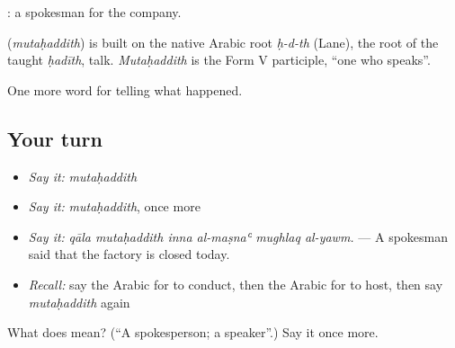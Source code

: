   : a spokesman for the company.

\begin{cousinweb}
\textbf{} (\emph{mutaḥaddith}) is built on the native Arabic root \emph{ḥ-d-th} (Lane), the root of the taught \emph{ḥadīth}, talk. \emph{Mutaḥaddith} is the Form V participle, \textquotedblleft{}one who speaks\textquotedblright{}.
\end{cousinweb}

\begin{grammarlens}[title={What you've built}]
One more word for telling what happened.
\end{grammarlens}

\subsection*{Your turn}
\begin{itemize}
\raggedright
  \item \emph{Say it:} \emph{mutaḥaddith}
  \item \emph{Say it:} \emph{mutaḥaddith}, once more
  \item \emph{Say it:} \emph{qāla mutaḥaddith inna al-maṣnaʿ mughlaq al-yawm.} — A spokesman said that the factory is closed today.
  \item \emph{Recall:} say the Arabic for to conduct, then the Arabic for to host, then say \emph{mutaḥaddith} again
\end{itemize}

\begin{tcolorbox}[breakable,colback=teal!4,colframe=teal!35!black,title={Before you move on}]
What does  mean? (\textquotedblleft{}A spokesperson; a speaker\textquotedblright{}.) Say it once more.
\end{tcolorbox}
